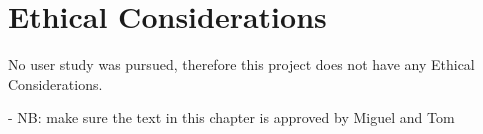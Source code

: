 \chapter*{Ethical Considerations}

No user study was pursued, therefore this project does not have any Ethical Considerations.

- NB: make sure the text in this chapter is approved by Miguel and Tom